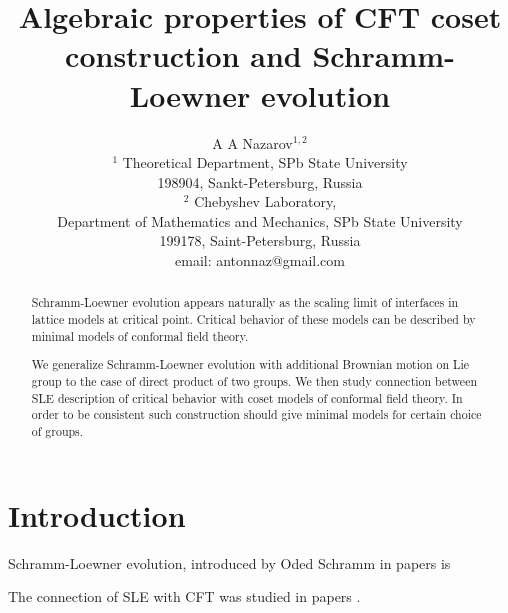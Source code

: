 \documentclass[12pt]{article}
\theoremstyle{definition}
\theoremstyle{definition} \newtheorem{Def}{Definition}
\begin{document}
\title{Algebraic properties of CFT coset construction and Schramm-Loewner evolution}
\author{A A Nazarov$^{1,2}$\\
  {\small $^1$ Theoretical Department, SPb State University}\\
  {\small 198904, Sankt-Petersburg, Russia}\\
  {\small$^{2}$ Chebyshev Laboratory,}\\
  {\small Department of Mathematics and Mechanics, SPb State University}\\
  {\small 199178, Saint-Petersburg, Russia}\\
  {\small email: antonnaz@gmail.com}}

\maketitle

\begin{abstract}
  Schramm-Loewner evolution appears naturally as the scaling limit of interfaces in lattice models at critical point. Critical behavior of these models can be described by minimal models of conformal field theory.

  We generalize Schramm-Loewner evolution with additional Brownian motion on Lie group to the case of direct product of two groups. We then study connection between SLE description of critical behavior with coset models of conformal field theory. In order to be consistent such construction should give minimal models for certain choice of groups. 

\end{abstract}

\section{Introduction}
Schramm-Loewner evolution, introduced by Oded Schramm in papers \cite{schramm2000scaling} is 

The connection of SLE with CFT was studied in papers \cite{bauer2004conformal,bauer2004cfts,bauer2003sle,bauer2002sle}.
\end{document}
